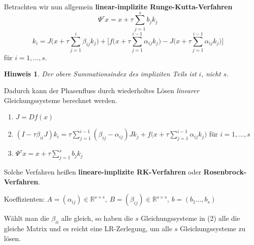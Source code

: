 \documentclass[german]{scrreprt}
\newcommand{\begriff}[1]{\textbf{#1}}
\newcommand{\R}{\mathbb R}
\theoremstyle{plain}
\theoremstyle{nonumberplain}
\theoremstyle{nonumberplain}
\newtheorem{hinw}{Hinweis}
\theoremstyle{nonumberplain}
\begin{document}
Betrachten wir nun allgemein \begriff{linear-implizite Runge-Kutta-Verfahren}
\begin{equation*}
\Psi^\tau x = x + \tau \sum_{j=1}^s b_j k_j
\end{equation*}
\begin{equation*}
k_i = J\Big(x+\tau\sum_{j=1}^i \beta_{ij} k_j\Big)
+ \bigg[ f\Big(x+\tau\sum_{j=1}^{i-1} \alpha_{ij} k_j\Big)
- J\Big(x+\tau\sum_{j=1}^{i-1} \alpha_{ij} k_j\Big)\bigg]
\end{equation*}
für $i=1,\dots,s$.

\begin{hinw}
	Der obere Summationsindex des impliziten Teils ist $i$, nicht $s$.
\end{hinw}

Dadurch kann der Phasenfluss durch wiederholtes Lösen \textit{linearer} Gleichungssysteme berechnet werden.
\begin{enumerate}
	\item $J = Df(x)$
	\item $\displaystyle (I-\tau\beta_{ii}J)k_i = \tau\sum_{j=1}^{i-1}(\beta_{ij}-\alpha_{ij})Jk_j + f\Big(x + \tau\sum_{j=1}^{i-1} \alpha_{ij} k_j\Big)$ für $i=1,\dots,s$
	\item $\displaystyle \Psi^\tau x = x + \tau\sum_{j=1}^{s} b_j k_j$
\end{enumerate}
Solche Verfahren heißen \begriff{lineare-implizite RK-Verfahren} oder \begriff{Rosenbrock-Verfahren}.


Koeffizienten: $A=(\alpha_{ij})\in\R^{s\times s},\ B=(\beta_{ij})\in\R^{s\times s},\  b=(b_1\hdots,b_s)$

Wählt man die $\beta_{ii}$ alle gleich, so haben die $s$ Gleichungssysteme in (2) alle die gleiche Matrix und es reicht eine LR-Zerlegung, um alle $s$ Gleichungssysteme zu lösen.
\end{document}
